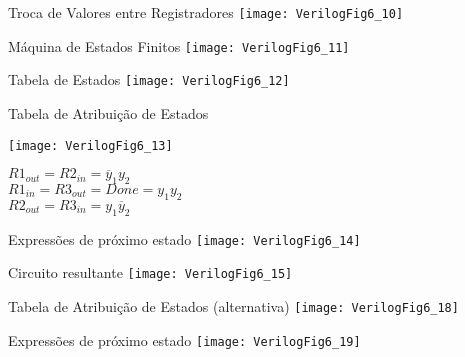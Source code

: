 

\subtitle{Circuitos Sequenciais: Máquinas de Estados Finitos} %



\begin{frame}
	\titlepage
\end{frame} 

\begin{frame}{Troca de Valores entre Registradores} \centering
    \texttt{[image: VerilogFig6\_10]} 
\end{frame}

\begin{frame}{Máquina de Estados Finitos} \centering
    \texttt{[image: VerilogFig6\_11]} 
\end{frame}

\begin{frame}{Tabela de Estados} \centering
    \texttt{[image: VerilogFig6\_12]} 
\end{frame}

\begin{frame}{Tabela de Atribuição de Estados} 
\begin{center}
    \texttt{[image: VerilogFig6\_13]} \\
\end{center}
    $R1_{out} = R2_{in} = \overline{y}_1y_2$ \\
    $R1_{in}  = R3_{out} = Done = y_1y_2$ \\
    $R2_{out} = R3_{in} = y_1\overline{y}_2$ \\
\end{frame}

\begin{frame}{Expressões de próximo estado} \centering
    \texttt{[image: VerilogFig6\_14]} 
\end{frame}

\begin{frame}{Circuito resultante} \centering
    \texttt{[image: VerilogFig6\_15]} 
\end{frame}

\begin{frame}{Tabela de Atribuição de Estados (alternativa)} \centering
    \texttt{[image: VerilogFig6\_18]} 
\end{frame}

\begin{frame}{Expressões de próximo estado} \centering
    \texttt{[image: VerilogFig6\_19]} 
\end{frame}

